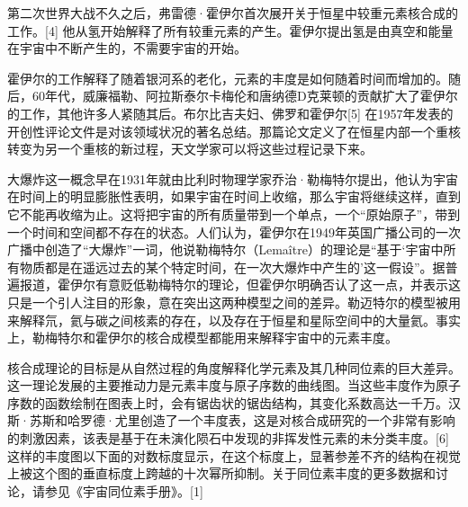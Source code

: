 第二次世界大战不久之后，弗雷德·霍伊尔首次展开关于恒星中较重元素核合成的工作。[4] 他从氢开始解释了所有较重元素的产生。霍伊尔提出氢是由真空和能量在宇宙中不断产生的，不需要宇宙的开始。

霍伊尔的工作解释了随着银河系的老化，元素的丰度是如何随着时间而增加的。随后，60年代，威廉福勒、阿拉斯泰尔卡梅伦和唐纳德D克莱顿的贡献扩大了霍伊尔的工作，其他许多人紧随其后。布尔比吉夫妇、佛罗和霍伊尔[5] 在1957年发表的开创性评论文件是对该领域状况的著名总结。那篇论文定义了在恒星内部一个重核转变为另一个重核的新过程，天文学家可以将这些过程记录下来。

大爆炸这一概念早在1931年就由比利时物理学家乔治·勒梅特尔提出，他认为宇宙在时间上的明显膨胀性表明，如果宇宙在时间上收缩，那么宇宙将继续这样，直到它不能再收缩为止。这将把宇宙的所有质量带到一个单点，一个“原始原子”，带到一个时间和空间都不存在的状态。人们认为，霍伊尔在1949年英国广播公司的一次广播中创造了“大爆炸”一词，他说勒梅特尔（Lemaître）的理论是“基于‘宇宙中所有物质都是在遥远过去的某个特定时间，在一次大爆炸中产生的’这一假设”。据普遍报道，霍伊尔有意贬低勒梅特尔的理论，但霍伊尔明确否认了这一点，并表示这只是一个引人注目的形象，意在突出这两种模型之间的差异。勒迈特尔的模型被用来解释氘，氦与碳之间核素的存在，以及存在于恒星和星际空间中的大量氦。事实上，勒梅特尔和霍伊尔的核合成模型都能用来解释宇宙中的元素丰度。

核合成理论的目标是从自然过程的角度解释化学元素及其几种同位素的巨大差异。这一理论发展的主要推动力是元素丰度与原子序数的曲线图。当这些丰度作为原子序数的函数绘制在图表上时，会有锯齿状的锯齿结构，其变化系数高达一千万。汉斯·苏斯和哈罗德·尤里创造了一个丰度表，这是对核合成研究的一个非常有影响的刺激因素，该表是基于在未演化陨石中发现的非挥发性元素的未分类丰度。[6] 这样的丰度图以下面的对数标度显示，在这个标度上，显著参差不齐的结构在视觉上被这个图的垂直标度上跨越的十次幂所抑制。关于同位素丰度的更多数据和讨论，请参见《宇宙同位素手册》。[1]